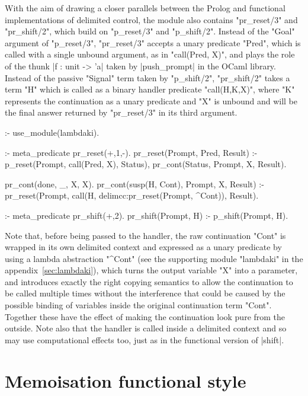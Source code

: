 With the aim of drawing a closer parallels between the Prolog and functional implementations of delimited
control, the module also contains "pr_reset/3" and "pr_shift/2", which build on "p_reset/3" and "p_shift/2".
Instead of the "Goal" argument of "p_reset/3", "pr_reset/3" accepts a unary predicate "Pred", which is
called with a single unbound argument, as in "call(Pred, X)", and plays the role of the thunk
|f : unit -> 'a| taken by |push_prompt| in the OCaml library. Instead of the passive "Signal" term
taken by "p_shift/2", "pr_shift/2" takes a term "H" which is called as
a binary handler predicate "call(H,K,X)", where "K" represents the continuation as a unary predicate 
and "X" is unbound and will be the final answer returned by "pr_reset/3" in its third argument.
\begin{prolog-framed}[name=delimcc, firstnumber=16]
  :- use_module(lambdaki).

  :- meta_predicate pr_reset(+,1,-).
  pr_reset(Prompt, Pred, Result) :-
     p_reset(Prompt, call(Pred, X), Status),
     pr_cont(Status, Prompt, X, Result).

  pr_cont(done, _, X, X).
  pr_cont(susp(H, Cont), Prompt, X, Result) :-
     pr_reset(Prompt, call(H, delimcc:pr_reset(Prompt, \X^Cont)), Result).

  :- meta_predicate pr_shift(+,2).
  pr_shift(Prompt, H) :- p_shift(Prompt, H).
\end{prolog-framed}
Note that, before being passed to the handler, the raw continuation "Cont" is wrapped in its
own delimited context
and expressed as a unary predicate by using a lambda abstraction "\X^Cont" (see the supporting
module "lambdaki" in the appendix~\ref{sec:lambdaki}), which turns the 
output variable "X" into a parameter,
and introduces exactly the right copying semantics to allow the continuation to be
called multiple times without the interference that could be caused by the possible
binding of variables inside the original continuation term "Cont". Together these have the
effect of making the continuation look pure from the outside. Note also that the handler
is called inside a delimited context and so may use computational effects too, just as
in the functional version of |shift|.

\section{Memoisation functional style}

